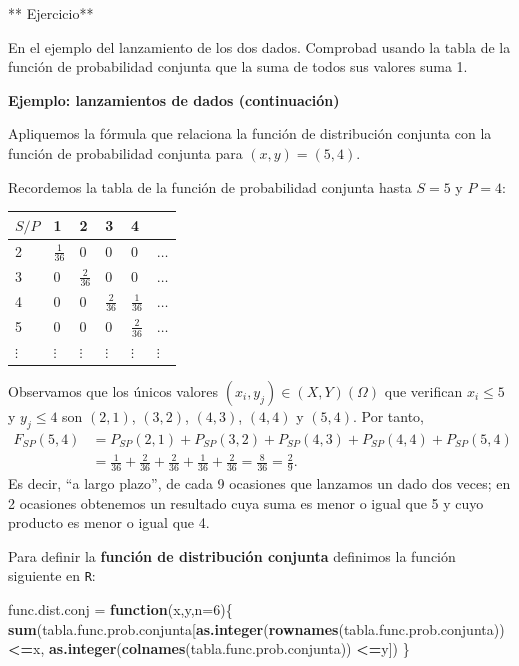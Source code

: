 \documentclass[]{book}
\newenvironment{Shaded}{\begin{snugshade}}{\end{snugshade}}
\newcommand{\ControlFlowTok}[1]{\textcolor[rgb]{0.13,0.29,0.53}{\textbf{#1}}}
\newcommand{\DataTypeTok}[1]{\textcolor[rgb]{0.13,0.29,0.53}{#1}}
\newcommand{\DecValTok}[1]{\textcolor[rgb]{0.00,0.00,0.81}{#1}}
\newcommand{\KeywordTok}[1]{\textcolor[rgb]{0.13,0.29,0.53}{\textbf{#1}}}
\newcommand{\NormalTok}[1]{#1}
\newcommand{\OperatorTok}[1]{\textcolor[rgb]{0.81,0.36,0.00}{\textbf{#1}}}
\newcommand{\StringTok}[1]{\textcolor[rgb]{0.31,0.60,0.02}{#1}}
\begin{document}
** Ejercicio**

En el ejemplo del lanzamiento de los dos dados. Comprobad usando la tabla de la función de probabilidad conjunta que la suma de todos sus valores suma 1.

\textbf{Ejemplo: lanzamientos de dados (continuación)}

Apliquemos la fórmula que relaciona la función de distribución conjunta con la función de probabilidad conjunta para \((x,y)=(5,4)\).

Recordemos la tabla de la función de probabilidad conjunta hasta \(S=5\) y \(P=4\):

\begin{longtable}[]{@{}llllll@{}}
\toprule
\(S/P\) & 1 & 2 & 3 & 4 &\tabularnewline
\midrule
\endhead
2 & \(\frac{1}{36}\) & 0 & 0 & 0 & \(\ldots\)\tabularnewline
3 & 0 & \(\frac{2}{36}\) & 0 & 0 & \(\ldots\)\tabularnewline
4 & 0 & 0 & \(\frac{2}{36}\) & \(\frac{1}{36}\) & \(\ldots\)\tabularnewline
5 & 0 & 0 & 0 & \(\frac{2}{36}\) & \(\ldots\)\tabularnewline
\(\vdots\) & \(\vdots\) & \(\vdots\) & \(\vdots\) & \(\vdots\) & \(\vdots\)\tabularnewline
\bottomrule
\end{longtable}

Observamos que los únicos valores \((x_i,y_j)\in (X,Y)(\Omega)\) que verifican \(x_i\leq 5\) y \(y_j\leq 4\) son \((2,1)\), \((3,2)\), \((4,3)\), \((4,4)\) y \((5,4)\). Por tanto,
\[
\begin{array}{rl}
F_{SP}(5,4) & = P_{SP}(2,1)+P_{SP}(3,2)+P_{SP}(4,3)+P_{SP}(4,4)+P_{SP}(5,4) \\ & = \frac{1}{36}+\frac{2}{36}+\frac{2}{36}+\frac{1}{36}+\frac{2}{36} = \frac{8}{36}=\frac{2}{9}.
\end{array}
\]
Es decir, ``a largo plazo'', de cada 9 ocasiones que lanzamos un dado dos veces; en 2 ocasiones obtenemos un resultado cuya suma es menor o igual que 5 y cuyo producto es menor o igual que 4.

Para definir la \textbf{función de distribución conjunta} definimos la función siguiente en \texttt{R}:

\begin{Shaded}
\begin{Highlighting}[]
\NormalTok{func.dist.conj =}\StringTok{ }\ControlFlowTok{function}\NormalTok{(x,y,}\DataTypeTok{n=}\DecValTok{6}\NormalTok{)\{}
  \KeywordTok{sum}\NormalTok{(tabla.func.prob.conjunta[}\KeywordTok{as.integer}\NormalTok{(}\KeywordTok{rownames}\NormalTok{(tabla.func.prob.conjunta))}\OperatorTok{<=}\NormalTok{x,}
                            \KeywordTok{as.integer}\NormalTok{(}\KeywordTok{colnames}\NormalTok{(tabla.func.prob.conjunta)) }\OperatorTok{<=}\NormalTok{y])}
\NormalTok{\}}
\end{Highlighting}
\end{Shaded}
\end{document}
